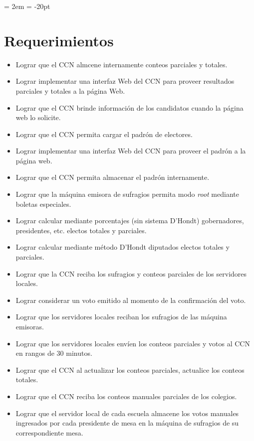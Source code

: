 \documentclass[spanish, 10pt,a4paper]{article}
\numberwithin{equation}{section} %
\begin{document}
{ \oddsidemargin = 2em
	\headheight = -20pt
	\maketitle
}
	
\section{Requerimientos}
\begin{itemize}
\item Lograr que el CCN almcene internamente conteos parciales y totales.
\item Lograr implementar una interfaz Web del CCN para proveer resultados parciales y totales a la página Web.
\item Lograr que el CCN brinde información de los candidatos cuando la página web lo solicite.
\item Lograr que el CCN permita cargar el padrón de electores.
\item Lograr implementar una interfaz Web del CCN para proveer el padrón a la página web.
\item Lograr que el CCN permita almacenar el padrón internamente.
\item Lograr que la máquina emisora de sufragios permita modo \emph{root} mediante boletas especiales.
\item Lograr calcular mediante porcentajes (sin sistema D'Hondt) gobernadores, presidentes, etc. electos totales y parciales.
\item Lograr calcular mediante método D'Hondt diputados electos totales y parciales.
\item Lograr que la CCN reciba los sufragios y conteos parciales de los servidores locales.
\item Lograr considerar un voto emitido al momento de la confirmación del voto.
\item Lograr que los servidores locales reciban los sufragios de las máquina emisoras.
\item Lograr que los servidores locales envíen los conteos parciales y votos al CCN en rangos de 30 minutos.
\item Lograr que el CCN al actualizar los conteos parciales, actualice los conteos totales.
\item Lograr que el CCN reciba los conteos manuales parciales de los colegios.
\item Lograr que el servidor local de cada escuela almacene los votos manuales ingresados por cada presidente de mesa en la máquina de sufragios de su correspondiente mesa.

\end{itemize}
\end{document}
